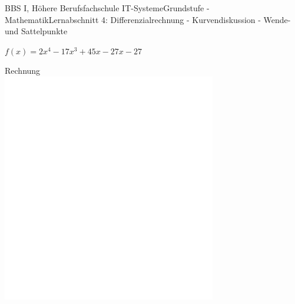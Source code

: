 \documentclass[oneside,openany,headings=optiontotoc,11pt,numbers=noenddot]{scrreprt}
\begin{document}
		\begin{worksheet}{BBS I, Höhere Berufsfachschule IT-Systeme}{Grundstufe - Mathematik}{Lernabschnitt 4: Differenzialrechnung - Kurvendiskussion - Wende- und Sattelpunkte}
			\begin{framed}
				\noindent
				\begin{center}
					\(f(x) = 2x^4 - 17x^3 +45x -27x -27\)
				\end{center}
				\footnotesize\color{codegray}Rechnung\\
				\includegraphics[width=0.7\textwidth]{../../empty.jpg}
			\end{framed}
		\end{worksheet}
\end{document}

